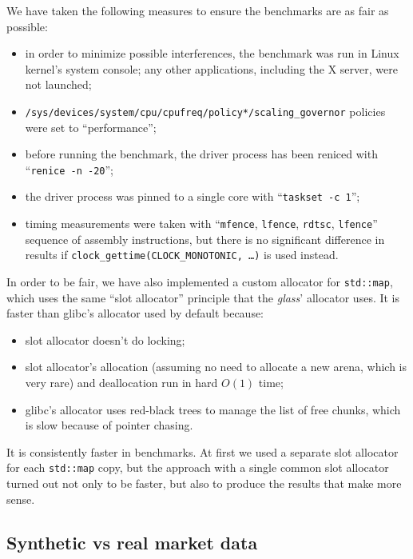 \documentclass[a4paper,12pt]{article}
\begin{document}
We have taken the following measures to ensure the benchmarks are as fair as possible:
\begin{itemize}

    \item in order to minimize possible interferences, the benchmark was run in Linux kernel's system console; any other applications, including the X server, were not launched;

    \item \texttt{/sys/devices/system/cpu/cpufreq/policy*/scaling\_governor} policies were set to ``performance'';

    \item before running the benchmark, the driver process has been reniced with ``\texttt{renice -n -20}'';

    \item the driver process was pinned to a single core with ``\texttt{taskset -c 1}'';

    \item timing measurements were taken with ``\texttt{mfence}, \texttt{lfence}, \texttt{rdtsc}, \texttt{lfence}'' sequence of assembly instructions,
          but there is no significant difference in results if \texttt{clock\_gettime(CLOCK\_MONOTONIC, …)} is used instead.

\end{itemize}

In order to be fair, we have also implemented a custom allocator for \texttt{std::map},
which uses the same ``slot allocator'' principle that the \textit{glass}' allocator uses.
It is faster than glibc's allocator used by default because:
\begin{itemize}
    \item slot allocator doesn't do locking;
    \item slot allocator's allocation (assuming no need to allocate a new arena, which is very rare) and deallocation run in hard $O(1)$ time;
    \item glibc's allocator uses red-black trees to manage the list of free chunks, which is slow because of pointer chasing.
\end{itemize}
It is consistently faster in benchmarks.
At first we used a separate slot allocator for each \texttt{std::map} copy, but
the approach with a single common slot allocator turned out not only to be faster,
but also to produce the results that make more sense.

\subsection{Synthetic vs real market data}
\end{document}
